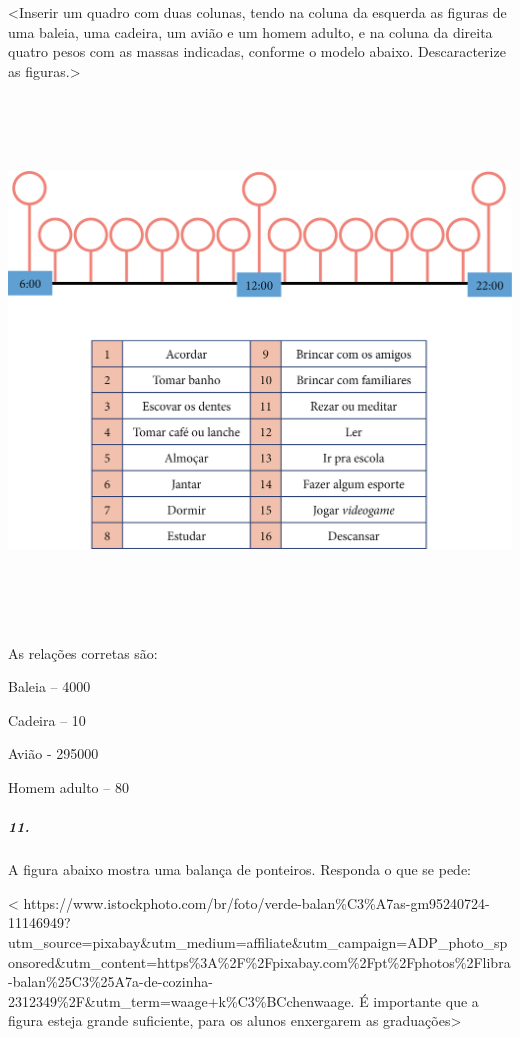 \textless{}Inserir um quadro com duas colunas, tendo na coluna da
esquerda as figuras de uma baleia, uma cadeira, um avião e um homem
adulto, e na coluna da direita quatro pesos com as massas indicadas,
conforme o modelo abaixo. Descaracterize as figuras.\textgreater{}

\includegraphics[width=5.28125in,height=5.51714in]{media/image51.png}

As relações corretas são:

Baleia -- 4000

Cadeira -- 10

Avião - 295000

Homem adulto -- 80

\subparagraph{11.}\label{section-38}

A figura abaixo mostra uma balança de ponteiros. Responda o que se pede:

\textless{}
https://www.istockphoto.com/br/foto/verde-balan\%C3\%A7as-gm95240724-11146949?utm\_source=pixabay\&utm\_medium=affiliate\&utm\_campaign=ADP\_photo\_sponsored\&utm\_content=https\%3A\%2F\%2Fpixabay.com\%2Fpt\%2Fphotos\%2Flibra-balan\%25C3\%25A7a-de-cozinha-2312349\%2F\&utm\_term=waage+k\%C3\%BCchenwaage.
É importante que a figura esteja grande suficiente, para os alunos
enxergarem as graduações\textgreater{}

